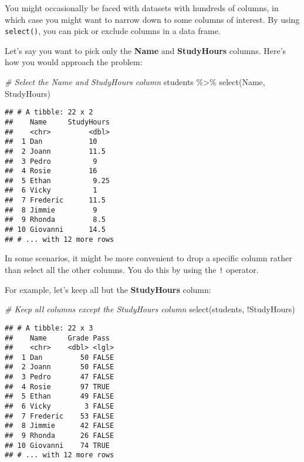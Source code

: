 \documentclass[
]{article}
\newenvironment{Shaded}{\begin{snugshade}}{\end{snugshade}}
\newcommand{\CommentTok}[1]{\textcolor[rgb]{0.56,0.35,0.01}{\textit{#1}}}
\newcommand{\FunctionTok}[1]{\textcolor[rgb]{0.00,0.00,0.00}{#1}}
\newcommand{\NormalTok}[1]{#1}
\newcommand{\SpecialCharTok}[1]{\textcolor[rgb]{0.00,0.00,0.00}{#1}}
\begin{document}
You might occasionally be faced with datasets with hundreds of columns,
in which case you might want to narrow down to some columns of interest.
By using \texttt{select()}, you can pick or exclude columns in a data
frame.

Let's say you want to pick only the \textbf{Name} and
\textbf{StudyHours} columns. Here's how you would approach the problem:

\begin{Shaded}
\begin{Highlighting}[]
\CommentTok{\# Select the Name and StudyHours  column}
\NormalTok{students }\SpecialCharTok{\%\textgreater{}\%} 
  \FunctionTok{select}\NormalTok{(Name, StudyHours)}
\end{Highlighting}
\end{Shaded}

\begin{verbatim}
## # A tibble: 22 x 2
##    Name     StudyHours
##    <chr>         <dbl>
##  1 Dan           10   
##  2 Joann         11.5 
##  3 Pedro          9   
##  4 Rosie         16   
##  5 Ethan          9.25
##  6 Vicky          1   
##  7 Frederic      11.5 
##  8 Jimmie         9   
##  9 Rhonda         8.5 
## 10 Giovanni      14.5 
## # ... with 12 more rows
\end{verbatim}

In some scenarios, it might be more convenient to drop a specific column
rather than select all the other columns. You do this by using the
\texttt{!} operator.

For example, let's keep all but the \textbf{StudyHours} column:

\begin{Shaded}
\begin{Highlighting}[]
\CommentTok{\# Keep all columns except the StudyHours column}
\FunctionTok{select}\NormalTok{(students, }\SpecialCharTok{!}\NormalTok{StudyHours)}
\end{Highlighting}
\end{Shaded}

\begin{verbatim}
## # A tibble: 22 x 3
##    Name     Grade Pass 
##    <chr>    <dbl> <lgl>
##  1 Dan         50 FALSE
##  2 Joann       50 FALSE
##  3 Pedro       47 FALSE
##  4 Rosie       97 TRUE 
##  5 Ethan       49 FALSE
##  6 Vicky        3 FALSE
##  7 Frederic    53 FALSE
##  8 Jimmie      42 FALSE
##  9 Rhonda      26 FALSE
## 10 Giovanni    74 TRUE 
## # ... with 12 more rows
\end{verbatim}
\end{document}
